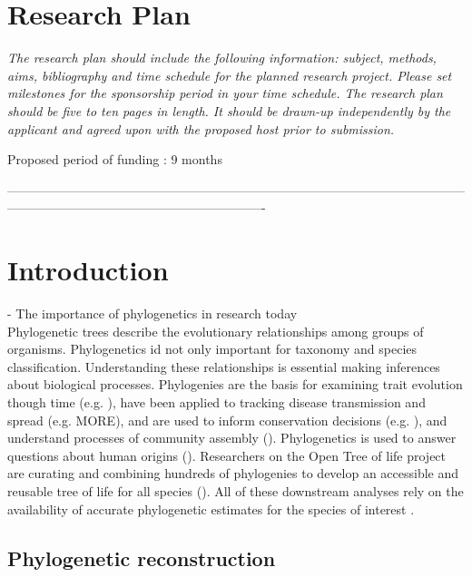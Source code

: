 \documentclass[10pt]{article}
\begin{document}
\section*{Research Plan}                   

\textsl{The research plan should include the following information: subject, methods, aims, bibliography and time schedule for the planned research project. Please set milestones for the sponsorship period in your time schedule.
The research plan should be five to ten pages in length.
It should be drawn-up independently by the applicant and agreed upon with the proposed host prior to submission.}

Proposed period of funding : 9 months


-------------------------------------------------------------------------------------------------------------------------------------------------------------------------
\section*{Introduction}
  - The importance of phylogenetics in research today\\
Phylogenetic trees describe the evolutionary relationships among groups of organisms. Phylogenetics id not only important for taxonomy and species classification. Understanding these relationships is essential making inferences about biological processes. Phylogenies are the basis for examining trait evolution though time (e.g. \cite{omeara_testing_2006}), have been applied to tracking disease transmission and spread (e.g. \cite{timme_phylogenetic_2013} MORE), and are used to inform conservation decisions (e.g. \cite{isaac_mammals_2007}), and understand processes of community assembly (\cite{emerson_phylogenetic_2008}). Phylogenetics is used to answer questions about human origins (\cite{endicott_using_2010}). Researchers on the Open Tree of life project are curating and combining hundreds of phylogenies to develop an accessible and reusable tree of life for all species (\cite{drew_lost_2013}). All of these downstream analyses rely on the availability of accurate phylogenetic estimates for the species of interest \cite{stoltzfus_phylotastic!_2013}.


\subsection*{Phylogenetic reconstruction}
\end{document}
